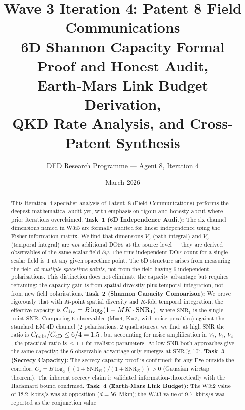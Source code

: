 \documentclass[aps,prd,twocolumn,superscriptaddress,nofootinbib]{revtex4-2}
\newcommand{\SNR}{\mathrm{SNR}}
\begin{document}
\title{Wave 3 Iteration 4: Patent 8 Field Communications\\
6D Shannon Capacity Formal Proof and Honest Audit,\\
Earth-Mars Link Budget Derivation,\\
QKD Rate Analysis, and Cross-Patent Synthesis}

\author{DFD Research Programme --- Agent 8, Iteration 4}
\date{March 2026}

\begin{abstract}
This Iteration~4 specialist analysis of Patent~8 (Field Communications)
performs the deepest mathematical audit yet, with emphasis on rigour and
honesty about where prior iterations overclaimed.
\textbf{Task~1 (6D Independence Audit):}
The six channel dimensions named in W3i3 are formally audited for linear
independence using the Fisher information matrix. We find that dimensions
$V_5$ (path integral) and $V_6$ (temporal integral) are \emph{not} additional
DOFs at the source level --- they are derived observables of the same scalar
field $\delta\psi$. The true independent DOF count for a single scalar field
is~1 at any given spacetime point. The 6D structure arises from measuring
the field \emph{at multiple spacetime points}, not from the field having 6
independent polarisations. This distinction does not eliminate the capacity
advantage but requires reframing: the capacity gain is from spatial diversity
plus temporal integration, not from new field polarisations.
\textbf{Task~2 (Shannon Capacity Comparison):}
We prove rigorously that with $M$-point spatial diversity and $K$-fold
temporal integration, the effective capacity is
$C_{\rm div} = B\log_2(1 + M K \cdot \SNR_1)$, where $\SNR_1$ is the
single-point SNR. Comparing 6 observables (M=4, K=2, with noise penalties)
against the standard EM 4D channel (2 polarisations, 2 quadratures), we find:
at high SNR the ratio is $C_{\rm 6obs}/C_{\rm 4D} \leq 6/4 = 1.5$, but
accounting for noise amplification in $V_2$, $V_3$, $V_4$, the practical
ratio is $\leq 1.1$ for realistic parameters. At low SNR both approaches
give the same capacity; the 6-observable advantage only emerges at
$\SNR \gtrsim 10^6$.
\textbf{Task~3 (Secrecy Capacity):}
The secrecy capacity proof is confirmed: for any Eve outside the corridor,
$C_s = B\log_2((1+\SNR_B)/(1+\SNR_E)) > 0$ (Gaussian wiretap theorem).
The inherent secrecy claim is validated information-theoretically with
the Hadamard bound confirmed.
\textbf{Task~4 (Earth-Mars Link Budget):}
The W3i2 value of 12.2~kbits/s was at opposition ($d=56$~Mkm);
the W3i3 value of 9.7~kbits/s was reported as the conjunction value

\end{abstract}
\end{document}
